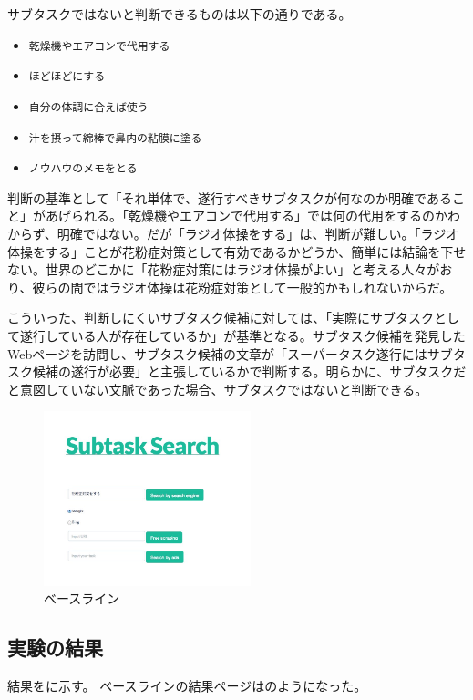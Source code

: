 \documentclass[submit,techreq]{ipsj}
\def\|{\verb|}
\begin{document}
サブタスクではないと判断できるものは以下の通りである。

\begin{itemize}
\item \|乾燥機やエアコンで代用する|
\item \|ほどほどにする|
\item \|自分の体調に合えば使う|
\item \|汁を摂って綿棒で鼻内の粘膜に塗る|
\item \|ノウハウのメモをとる|
\end{itemize}


判断の基準として「それ単体で、遂行すべきサブタスクが何なのか明確であること」があげられる。「乾燥機やエアコンで代用する」では何の代用をするのかわからず、明確ではない。だが「ラジオ体操をする」は、判断が難しい。「ラジオ体操をする」ことが花粉症対策として有効であるかどうか、簡単には結論を下せない。世界のどこかに「花粉症対策にはラジオ体操がよい」と考える人々がおり、彼らの間ではラジオ体操は花粉症対策として一般的かもしれないからだ。

こういった、判断しにくいサブタスク候補に対しては、「実際にサブタスクとして遂行している人が存在しているか」が基準となる。サブタスク候補を発見したWebページを訪問し、サブタスク候補の文章が「スーパータスク遂行にはサブタスク候補の遂行が必要」と主張しているかで判断する。明らかに、サブタスクだと意図していない文脈であった場合、サブタスクではないと判断できる。




\begin{figure}[tb]
\includegraphics[width=6cm, bb=0 0 550 719]{base_line1.jpg}
\caption{ベースライン}
\label{fig:single}
\end{figure}


\subsection{実験の結果}

結果をに示す。
ベースラインの結果ページはのようになった。
\end{document}
